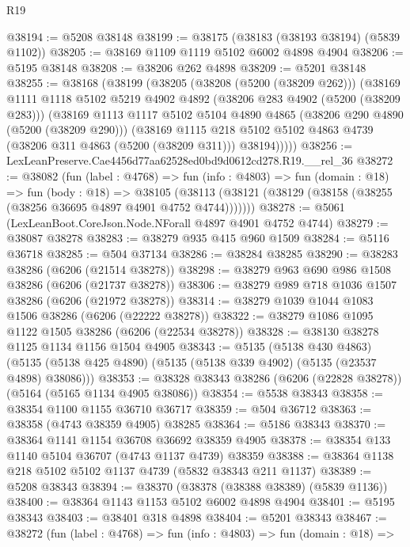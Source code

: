 \begin{lexlean}{R19}
\begin{coremodule}
{{{{{{{{{{{@38194 := @5208 @38148
@38199 := @38175 (@38183 (@38193 @38194) (@5839 @1102))
@38205 := @38169 @1109 @1119 @5102 @6002 @4898 @4904
@38206 := @5195 @38148
@38208 := @38206 @262 @4898
@38209 := @5201 @38148
@38255 := @38168
    (@38199
      (@38205
        (@38208 (@5200 (@38209 @262)))
        (@38169
          @1111
          @1118
          @5102
          @5219
          @4902
          @4892
          (@38206 @283 @4902 (@5200 (@38209 @283)))
          (@38169
            @1113
            @1117
            @5102
            @5104
            @4890
            @4865
            (@38206 @290 @4890 (@5200 (@38209 @290)))
            (@38169
              @1115
              @218
              @5102
              @5102
              @4863
              @4739
              (@38206 @311 @4863 (@5200 (@38209 @311)))
              @38194)))))
@38256 := LexLeanPreserve.Cae4456d77aa62528ed0bd9d0612cd278.R19.__rel_36
@38272 := @38082
    (fun (label : @4768) =>
    fun (info : @4803) =>
    fun (domain : @18) =>
    fun (body : @18) =>
    @38105 (@38113 (@38121 (@38129 (@38158 (@38255 (@38256 @36695 @4897 @4901 @4752 @4744)))))))
@38278 := @5061 (LexLeanBoot.CoreJson.Node.NForall @4897 @4901 @4752 @4744)
@38279 := @38087 @38278
@38283 := @38279 @935 @415 @960 @1509
@38284 := @5116 @36718
@38285 := @504 @37134
@38286 := @38284 @38285
@38290 := @38283 @38286 (@6206 (@21514 @38278))
@38298 := @38279 @963 @690 @986 @1508 @38286 (@6206 (@21737 @38278))
@38306 := @38279 @989 @718 @1036 @1507 @38286 (@6206 (@21972 @38278))
@38314 := @38279 @1039 @1044 @1083 @1506 @38286 (@6206 (@22222 @38278))
@38322 := @38279 @1086 @1095 @1122 @1505 @38286 (@6206 (@22534 @38278))
@38328 := @38130 @38278 @1125 @1134 @1156 @1504 @4905
@38343 := @5135
    (@5138 @430 @4863)
    (@5135 (@5138 @425 @4890) (@5135 (@5138 @339 @4902) (@5135 (@23537 @4898) @38086)))
@38353 := @38328 @38343 @38286 (@6206 (@22828 @38278)) (@5164 (@5165 @1134 @4905 @38086))
@38354 := @5538 @38343
@38358 := @38354 @1100 @1155 @36710 @36717
@38359 := @504 @36712
@38363 := @38358 (@4743 @38359 @4905) @38285
@38364 := @5186 @38343
@38370 := @38364 @1141 @1154 @36708 @36692 @38359 @4905
@38378 := @38354 @133 @1140 @5104 @36707 (@4743 @1137 @4739) @38359
@38388 := @38364 @1138 @218 @5102 @5102 @1137 @4739 (@5832 @38343 @211 @1137)
@38389 := @5208 @38343
@38394 := @38370 (@38378 (@38388 @38389) (@5839 @1136))
@38400 := @38364 @1143 @1153 @5102 @6002 @4898 @4904
@38401 := @5195 @38343
@38403 := @38401 @318 @4898
@38404 := @5201 @38343
@38467 := @38272
    (fun (label : @4768) =>
    fun (info : @4803) =>
    fun (domain : @18) =>
}}}}}}}}}}}
\end{coremodule}
\end{lexlean}
